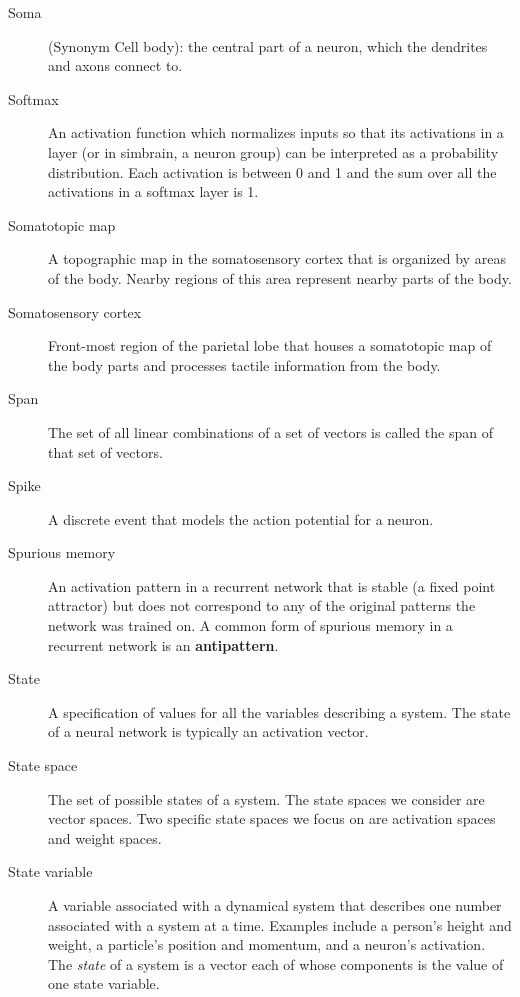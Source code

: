 \begin{description}

\item[Soma] (Synonym Cell body): the central part of a neuron, which the dendrites and axons connect to.

\item[Softmax] An activation function which normalizes inputs so that its activations in a layer (or in simbrain, a neuron group) can be interpreted as a probability distribution. Each activation is between 0 and 1 and the sum over all the activations in a softmax layer is 1. 

\item[Somatotopic map] A topographic map in the somatosensory cortex that is organized by areas of the body. Nearby regions of this area represent nearby parts of the body.

\item[Somatosensory cortex] Front-most region of the parietal lobe that houses a somatotopic map of the body parts and processes tactile information from the body.

\item[Span] The set of all linear combinations of a set of vectors is called the span of that set of vectors.

\item[Spike] A discrete event that models the action potential for a neuron.

\item[Spurious memory] An activation pattern in a recurrent network that is stable (a fixed point attractor) but does not correspond to any of the original patterns the network was trained on. A common form of spurious memory in a recurrent network is an \textbf{antipattern}.

\item[State] A specification of values for all the variables describing a system. The state of a neural network is typically an activation vector.

\item[State space] The set of possible states of a system. The state spaces we consider are vector spaces. Two specific state spaces we focus on are activation spaces and weight spaces.

\item[State variable] A variable associated with a dynamical system that describes one number associated with a system at a time. Examples include a person's height and weight, a particle's position and momentum, and a neuron's activation. The \emph{state} of a system is a vector each of whose components is the value of one state variable. 


\end{description}
